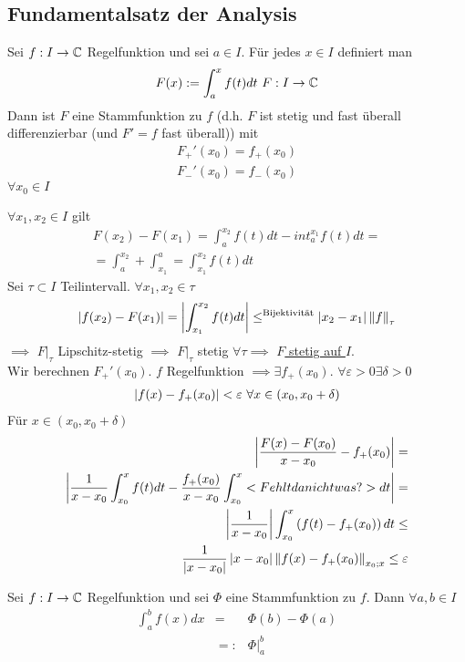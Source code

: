 \subsection{Fundamentalsatz der Analysis}
\begin{Sat}
  Sei $f:I\to\mathbb{C}$ Regelfunktion und sei $a\in I$. Für jedes $x\in I$ definiert man
  \[F(x):=\int_a^x f(t)dt\ F:I\to\mb{C}\]
  Dann ist $F$ eine Stammfunktion zu $f$ (d.h. $F$ ist stetig und fast überall differenzierbar (und $F'=f$ fast überall)) mit
  \begin{align*}
    F_+'(x_0)=f_+(x_0)\\
    F_-'(x_0)=f_-(x_0)
  \end{align*}
  $\forall x_0 \in I$
\end{Sat}
\begin{Bew}
  $\forall x_1,x_2\in I$ gilt
  \begin{align*}
    F(x_2)-F(x_1)=\int_a^{x_2}f(t)dt-int^{x_1}_a f(t)dt =\\
    =\int^{x_2}_a+\int^a_{x_1}= \int^{x_2}_{x_1}f(t)dt    
  \end{align*}
  Sei $\tau\subset I$ Teilintervall. $\forall x_1, x_2\in \tau$
  \begin{align*}
    \left| f(x_2)-F(x_1) \right|=\left| \int^{x_2}_{x_1}f(t)dt \right|\leq^{\text{Bijektivität}} \left| x_2-x_1 \right|\left\| f \right\|_\tau
  \end{align*}
  $\implies$ $F|_\tau$ Lipschitz-stetig $\implies$ $F|_\tau$ stetig $\forall \tau \implies$ \underline{$F$ stetig auf $I$}.\\
  Wir berechnen $F_+'(x_0)$. $f$ Regelfunktion $\implies \exists f_+(x_0)$. $\forall \varepsilon>0 \exists \delta >0$
  \begin{align*}
    \left| f(x)-f_+(x_0) \right|<\varepsilon\ \forall x\in(x_0, x_0+\delta)\\
  \end{align*}
  Für $x\in (x_0, x_0+\delta)$
  \begin{align*}
    \left|  \frac{F(x)-F(x_0)}{x-x_0} -f_+(x_0)  \right| = \\ \left|  \frac{1}{x-x_0} \int_{x_0}^x f(t)dt-\frac{f_+(x_0)}{x-x_0} \int_{x_0}^x <Fehlt da nicht was?> dt \right| = \\
    \left| \frac{1}{x-x_0} \right|\int_{x_0}^x\left( f(t)-f_+(x_0) \right)dt \leq\\
    \frac{1}{\left| x-x_0 \right|}\left| x-x_0 \right|\left\| f(x)-f_+(x_0) \right\|_{x_0;x} \leq \varepsilon
  \end{align*}
\end{Bew}
\begin{Kor}
  Sei $f:I\to\mathbb{C}$ Regelfunktion und sei $\Phi$ eine Stammfunktion zu $f$. Dann $\forall a,b\in I$
  \begin{align*}
    \int^b_af(x)dx&=&\Phi(b)-\Phi(a)\\
    &=:&\Phi|^b_a
  \end{align*}
\end{Kor}
